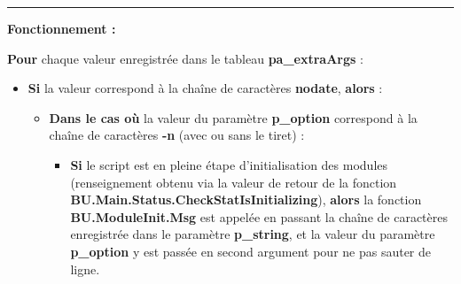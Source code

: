 \documentclass[a4paper,10pt]{article}
\begin{document}
\setlength{\parskip}{2em}


\par\noindent\rule{\textwidth}{0.4pt}

\setlength{\parskip}{1em}

\begin{justify}
    \textbf{Fonctionnement :}

    \textbf{\color{loop}Pour} chaque valeur enregistrée dans le tableau \textbf{\color{vars}pa\_extraArgs} :
\end{justify}

\begin{itemize}
    \item
    {
        \begin{justify}
            \textbf{\color{cond}Si} la valeur correspond à la chaîne de caractères \textbf{nodate}, \textbf{\color{cond}alors} :
        \end{justify}

        \setlength{\parskip}{1em}

        \begin{itemize}
            \item
            {
                \begin{justify}
                    \textbf{\color{case}Dans le cas où} la valeur du paramètre \textbf{\color{vars}p\_option} correspond à la chaîne de caractères \textbf{-n} (avec ou sans le tiret) :
                \end{justify}

                \setlength{\parskip}{1em}

                \begin{itemize}
                    \item
                    {
                        \begin{justify}
                            \textbf{\color{cond}Si} le script est en pleine étape d'initialisation des modules (renseignement obtenu via la valeur de retour de la fonction \textbf{\color{func}BU.Main.Status.CheckStatIsInitializing}), \textbf{\color{cond}alors} la fonction \textbf{\color{func}BU.ModuleInit.Msg} est appelée en passant la chaîne de caractères enregistrée dans le paramètre \textbf{\color{vars}p\_string}, et la valeur du paramètre \textbf{\color{vars}p\_option} y est passée en second argument pour ne pas sauter de ligne.
                        \end{justify}

}
\end{itemize}}
\end{itemize}}
\end{itemize}
\end{document}
